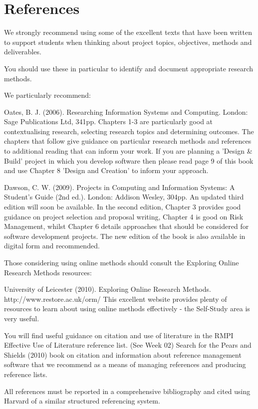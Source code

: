 \section*{References}
We strongly recommend using some of the excellent texts that have been written to support students when thinking about project topics, objectives, methods and deliverables.

You should use these in particular to identify and document appropriate research methods.

We particularly recommend:

Oates, B. J. (2006). Researching Information Systems and Computing. London: Sage Publications Ltd, 341pp.
Chapters 1-3 are particularly good at contextualising research, selecting research topics and determining outcomes. The chapters that follow give guidance on particular research methods and references to additional reading that can inform your work. If you are planning a 'Design \& Build' project in which you develop software then please read page 9 of this book and use Chapter 8 'Design and Creation' to inform your approach.

Dawson, C. W. (2009). Projects in Computing and Information Systems: A Student's Guide (2nd ed.). London: Addison Wesley, 304pp.
An updated third edition will soon be available. In the second edition, Chapter 3 provides good guidance on project selection and proposal writing, Chapter 4 is good on Risk Management, whilst Chapter 6 details approaches that should be considered for software development projects.
The new edition of the book is also available in digital form and recommended. 

Those considering using online methods should consult the Exploring Online Research Methods resources:

University of Leicester (2010). Exploring Online Research Methods. 
http://www.restore.ac.uk/orm/
This excellent website provides plenty of resources to learn about using online methods effectively - the Self-Study area is very useful.

You will find useful guidance on citation and use of literature in the RMPI Effective Use of Literature reference list. (See Week 02) Search for the Pears and Shields (2010) book on citation and information about reference management software that we recommend as a means of managing references and producing reference lists.

All references must be reported in a comprehensive bibliography and cited using Harvard of a similar structured referencing system.